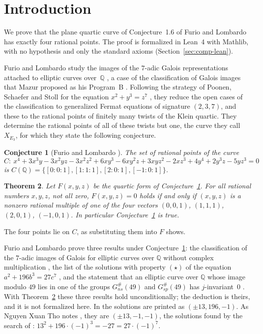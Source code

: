 \documentclass[11pt]{amsart}
\newtheorem{theorem}{Theorem}[section]
\newtheorem{conjecture}[theorem]{Conjecture}
\theoremstyle{definition}
\numberwithin{equation}{section}
\newcommand{\Q}{\mathbb{Q}}
\newcommand{\lean}[1]{\ignorespaces}
\begin{document}
\clearpage
\section{Introduction}\label{sec:intro}

We prove that the plane quartic curve of Conjecture~1.6 of Furio and Lombardo has exactly four rational points. The proof is formalized in Lean~4 with Mathlib, with no hypothesis and only the standard axioms (Section~\ref{sec:comp-lean}).

Furio and Lombardo study the images of the $7$-adic Galois representations attached to elliptic curves over~$\Q$ \cite{FL25}, a case of the classification of Galois images that Mazur proposed as his Program~B \cite[p.~109]{Mazur77}. Following the strategy of Poonen, Schaefer and Stoll for the equation $x^2+y^3=z^7$ \cite{PSS07}, they reduce the open cases of the classification to generalized Fermat equations of signature $(2,3,7)$, and these to the rational points of finitely many twists of the Klein quartic. They determine the rational points of all of these twists but one, the curve they call $X_{E_3}$, for which they state the following conjecture.

\begin{conjecture}[{Furio and Lombardo \cite[Conjecture~1.6]{FL25}}]\label{conj:FL}\lean{FurioLombardo.Conjecture}
The set of rational points of the curve
\[
C:\ x^4 + 3x^3y - 3x^2yz - 3x^2z^2 + 6xy^3 - 6xy^2z + 3xyz^2 - 2xz^3 + 4y^4 + 2y^3z - 5yz^3 = 0
\]
is $C(\Q)=\{[0:0:1],[1:1:1],[2:0:1],[-1:0:1]\}$.
\end{conjecture}

\begin{theorem}\label{thm:main}\lean{FurioLombardo.conjecture_1_6, FurioLombardo.Discharge.M4Box.onlyFourPoints, FurioLombardo.OnlyFourPoints, FurioLombardo.conjecture_iff_onlyFourPoints}
Let $F(x,y,z)$ be the quartic form of Conjecture~\ref{conj:FL}. For all rational numbers $x,y,z$, not all zero, $F(x,y,z)=0$ holds if and only if $(x,y,z)$ is a nonzero rational multiple of one of the four vectors $(0,0,1)$, $(1,1,1)$, $(2,0,1)$, $(-1,0,1)$. In particular Conjecture~\ref{conj:FL} is true.
\end{theorem}

The four points lie on $C$, as substituting them into $F$ shows.

Furio and Lombardo prove three results under Conjecture~\ref{conj:FL}: the classification of the $7$-adic images of Galois for elliptic curves over $\Q$ without complex multiplication \cite[Theorem~1.7]{FL25}, the list of the solutions with property $(\star)$ of the equation $a^2+196b^3=27c^7$ \cite[Theorem~3.5(2)]{FL25}, and the statement that an elliptic curve over $\Q$ whose image modulo $49$ lies in one of the groups $G_{ns}^\#(49)$ and $G_{sp}^\#(49)$ has $j$-invariant~$0$ \cite[Corollary~3.7(2)]{FL25}. With Theorem~\ref{thm:main} these three results hold unconditionally; the deduction is theirs, and it is not formalized here. In \cite[Theorem~3.5(2)]{FL25} the solutions are printed as $(\pm13,196,-1)$. As Nguyen Xuan Tho notes \cite{NguyenXuanTho26}, they are $(\pm13,-1,-1)$, the solutions found by the search of \cite[Remark~3.6]{FL25}: $13^2+196\cdot(-1)^3=-27=27\cdot(-1)^7$.
\end{document}
